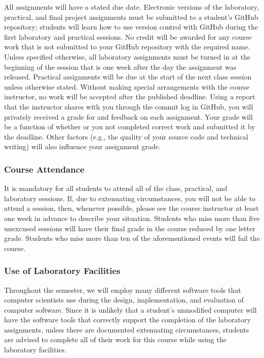 \documentclass[11pt]{article}
\begin{document}
All assignments will have a stated due date. Electronic versions of the
laboratory, practical, and final project assignments must be submitted to a
student's GitHub repository; students will learn how to use version control with
GitHub during the first laboratory and practical sessions. No credit will be
awarded for any course work that is not submitted to your GitHub repository with
the required name. Unless specified otherwise, all laboratory assignments must
be turned in at the beginning of the session that is one week after the day the
assignment was released. Practical assignments will be due at the start of the
next class session unless otherwise stated. Without making special arrangements
with the course instructor, no work will be accepted after the published
deadline. Using a report that the instructor shares with you through the commit
log in GitHub, you will privately received a grade for and feedback on each
assignment. Your grade will be a function of whether or you not completed
correct work and submitted it by the deadline. Other factors (e.g., the quality
of your source code and technical writing) will also influence your assignment
grade.

\vspace*{-.1in}

\subsubsection*{Course Attendance}

It is mandatory for all students to attend all of the class, practical, and
laboratory sessions. If, due to extenuating circumstances, you will not be able
to attend a session, then, whenever possible, please see the course instructor
at least one week in advance to describe your situation. Students who miss more
than five unexcused sessions will have their final grade in the course reduced
by one letter grade. Students who miss more than ten of the aforementioned
events will fail the course.

\vspace*{-.05in}

\subsubsection*{Use of Laboratory Facilities}

Throughout the semester, we will employ many different software tools that
computer scientists use during the design, implementation, and evaluation of
computer software. Since it is unlikely that a student's unmodified computer
will have the software tools that correctly support the completion of the
laboratory assignments, unless there are documented extenuating circumstances,
students are advised to complete all of their work for this course while using
the laboratory facilities.
\end{document}

